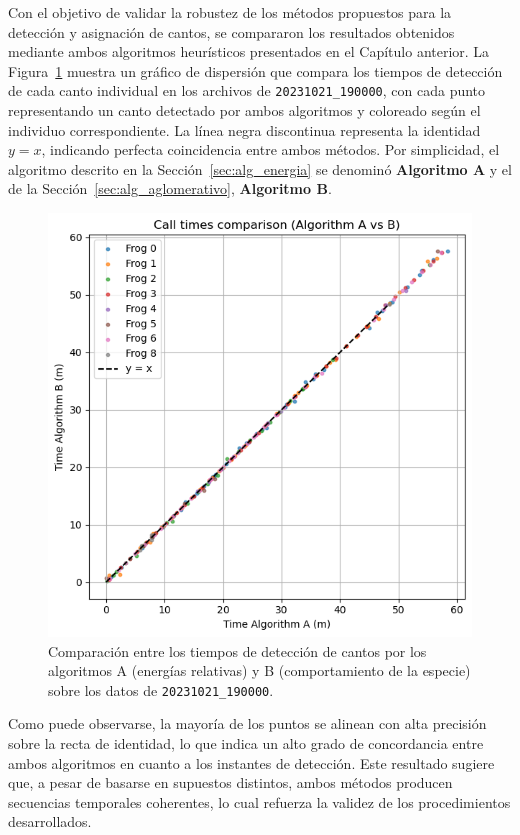 Con el objetivo de validar la robustez de los métodos propuestos 
para la detección y asignación de cantos, se compararon los 
resultados obtenidos mediante ambos algoritmos heurísticos 
presentados en el Capítulo anterior. 
La Figura~\ref{fig:alg_comparison} muestra un gráfico de 
dispersión que compara los tiempos de detección de cada canto 
individual en los archivos de \texttt{20231021\_190000}, con cada 
punto representando un canto detectado por ambos algoritmos y 
coloreado según el individuo correspondiente. La línea negra 
discontinua representa la identidad \( y = x \), indicando 
perfecta coincidencia entre ambos métodos. Por simplicidad,
el algoritmo descrito en la Sección~\ref{sec:alg_energia} se
denominó \textbf{Algoritmo A} y el de la Sección~\ref{sec:alg_aglomerativo},
\textbf{Algoritmo B}.

\begin{figure}[ht]
    \centering
    \includegraphics[width=0.7\linewidth]{Graphics/times_comparison.png}
    \caption{Comparación entre los tiempos de detección de cantos por los algoritmos A (energías relativas) y B (comportamiento de la especie) sobre los datos de \texttt{20231021\_190000}.}
    \label{fig:alg_comparison}
\end{figure}

Como puede observarse, la mayoría de los puntos se alinean con 
alta precisión sobre la recta de identidad, lo que indica un 
alto grado de concordancia entre ambos algoritmos en cuanto a 
los instantes de detección. Este resultado sugiere que, a pesar 
de basarse en supuestos distintos, ambos métodos producen 
secuencias temporales coherentes, lo cual refuerza la validez 
de los procedimientos desarrollados.

